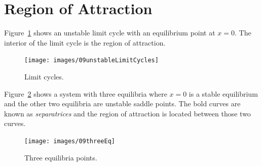 \section{Region of Attraction}
Figure~\ref{fig:09unstableLimitCycles} shows an unstable limit cycle with an equilibrium point at $x=0$.
The interior of the limit cycle is the region of attraction.

\begin{figure}[ht!]
\centering
\texttt{[image: images/09unstableLimitCycles]}
\caption{Limit cycles.}%
\label{fig:09unstableLimitCycles}
\end{figure}

Figure~\ref{fig:09threeEq} shows a system with three equilibria where $x=0$ is a stable equilibrium and the other two equilibria are unstable saddle points.
The bold curves are known as \textit{separatrices} and the region of attraction is located between those two curves.

\begin{figure}[ht!]
\centering
\texttt{[image: images/09threeEq]}
\caption{Three equilibria points.}%
\label{fig:09threeEq}
\end{figure}

